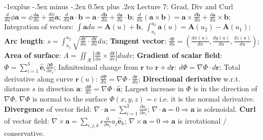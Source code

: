 \documentclass[10pt,landscape]{article}
\makeatletter
\renewcommand{\subsection}{\@startsection{subsection}{2}{0mm}%
                                {-1explus -.5ex minus -.2ex}%
                                {0.5ex plus .2ex}%
                                {\normalfont\normalsize\bfseries}}
\makeatother
\begin{document}
\begin{multicols}{3}
\subsection{Lecture 7: Grad, Div and Curl}
$\frac{d}{du} \phi \mathbf{a} = \phi \frac{d\mathbf{a}}{du} + \frac{d\phi}{du} 
	\mathbf{a}$;
$\frac{d}{du} \mathbf{a} \cdot \mathbf{b} = \mathbf{a} \cdot
	\frac{d\mathbf{b}}{du} + \frac{d\mathbf{a}}{du} \cdot \mathbf{b}$;
$\frac{d}{du} (\mathbf{a} \times \mathbf{b}) = \mathbf{a} \times
	\frac{d\mathbf{b}}{du} + \frac{d\mathbf{a}}{du} \times \mathbf{b}$;
Integration of vectors: $\int \mathbf{a} du = \mathbf{A}(u) + \mathbf{b}$, 
	$\int_{u_1}^{u_2} \mathbf{a}(u) = \mathbf{A}(u_2) - \mathbf{A}(u_1)$;
\textbf{Arc length}: $s = \int_{u_1}^{u_2} \sqrt{\frac{d\mathbf{r}}{du} \cdot
	\frac{d\mathbf{r}}{du}} du$;
\textbf{Tangent vector}: $\frac{d\mathbf{r}}{du} = \left( \frac{dx(u)}{du},
	\frac{dy(u)}{du}, \frac{dz(u)}{du} \right)$;
\textbf{Area of surface}: $A = \iint_\mathcal{R} \left| \frac{d\mathbf{r}}{du} \times 
	\frac{d\mathbf{r}}{dv} \right| dudv$;
\textbf{Gradient of scalar field}: $\Phi = \sum_{i=1}^3 \hat{\mathbf{e}}_i 
	\frac{\partial \Phi}{\partial x_i}$;
Infinitesimal change from $\mathbf{r}$ to $\mathbf{r} + d\mathbf{r}$: 
	$d\Phi = \nabla \Phi \cdot d\mathbf{r}$;
Total derivative along curve $\mathbf{r}(u)$: 
	$\frac{d\Phi}{du} = \nabla \Phi \cdot \frac{d\mathbf{r}}{du}$;
\textbf{Directional derivative} w.r.t. distance $s$ in direction $\mathbf{a}$: 
	$\frac{d\Phi}{ds} = \nabla \Phi \cdot \hat{\mathbf{a}}$;
Largest increase in $\Phi$ is in the direction of $\nabla \Phi$.
$\nabla\Phi$ is normal to the surface $\Phi(x,y,z)=c$ i.e. it is the normal
	derivative.
\textbf{Divergence} of vector field: $\nabla \cdot \mathbf{a} = \sum_{i=1}^3 
	\frac{\partial a_i}{\partial x_i}$;
$\nabla \cdot \mathbf{a} = 0 \Rightarrow \mathbf{a}$ is solenoidal.
\textbf{Curl} of vector field: $\nabla \times \mathbf{a} = \sum_{i,j,k}
	\epsilon \frac{\partial}{\partial x_i} a_j \hat{\mathbf{e}}_k$;
$\nabla \times \mathbf{a} = 0 \Rightarrow \mathbf{a}$ is irrotational / conservative.


\end{multicols}
\end{document}
